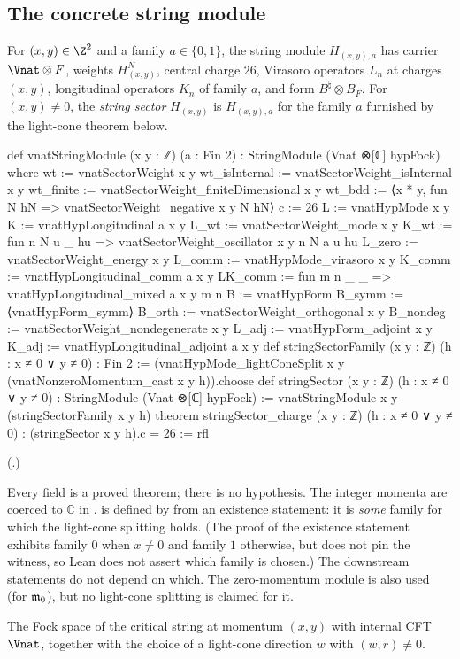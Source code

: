 \subsection{The concrete string module}

\begin{definition}\label{ch18:def:vnatstringmodule}
For $(x,y)\in\Z^2$ and a family $a\in\{0,1\}$, the string module $H_{(x,y),a}$ has carrier
$\Vnat\otimes F$, weights $H^N_{(x,y)}$, central charge $26$, Virasoro operators $L_n$ at charges $(x,y)$, longitudinal
operators $K_n$ of family $a$, and form $B^\natural\otimes B_F$.  For $(x,y)\neq0$, the \emph{string sector}
$H_{(x,y)}$ is $H_{(x,y),a}$ for the family $a$ furnished by the light-cone theorem below.
\end{definition}
\begin{leancode}
def vnatStringModule (x y : ℤ) (a : Fin 2) : StringModule (Vnat ⊗[ℂ] hypFock) where
  wt := vnatSectorWeight x y
  wt_isInternal := vnatSectorWeight_isInternal x y
  wt_finite := vnatSectorWeight_finiteDimensional x y
  wt_bdd := ⟨x * y, fun N hN => vnatSectorWeight_negative x y N hN⟩
  c := 26
  L := vnatHypMode x y
  K := vnatHypLongitudinal a x y
  L_wt := vnatSectorWeight_mode x y
  K_wt := fun n N u _ hu => vnatSectorWeight_oscillator x y n N a u hu
  L_zero := vnatSectorWeight_energy x y
  L_comm := vnatHypMode_virasoro x y
  K_comm := vnatHypLongitudinal_comm a x y
  LK_comm := fun m n _ _ => vnatHypLongitudinal_mixed a x y m n
  B := vnatHypForm
  B_symm := ⟨vnatHypForm_symm⟩
  B_orth := vnatSectorWeight_orthogonal x y
  B_nondeg := vnatSectorWeight_nondegenerate x y
  L_adj := vnatHypForm_adjoint x y
  K_adj := vnatHypLongitudinal_adjoint a x y
def stringSectorFamily (x y : ℤ) (h : x ≠ 0 ∨ y ≠ 0) : Fin 2 :=
  (vnatHypMode_lightConeSplit x y (vnatNonzeroMomentum_cast x y h)).choose
def stringSector (x y : ℤ) (h : x ≠ 0 ∨ y ≠ 0) :
    StringModule (Vnat ⊗[ℂ] hypFock) := vnatStringModule x y (stringSectorFamily x y h)
theorem stringSector_charge (x y : ℤ) (h : x ≠ 0 ∨ y ≠ 0) :
    (stringSector x y h).c = 26 := rfl
\end{leancode}
(.)
\begin{dictionary}
Every field is a proved theorem; there is no hypothesis.  The integer momenta are coerced to $\mathbb C$
in .   is defined by  from an existence
statement: it is \emph{some} family for which the light-cone splitting holds.  (The proof of the existence statement
exhibits family $0$ when $x\neq0$ and family $1$ otherwise, but  does not pin the witness, so Lean does not
assert which family is chosen.)  The downstream statements do not depend on which.  The zero-momentum
module  is also used (for $\mathfrak{m}_0$), but no light-cone splitting is claimed for it.
\end{dictionary}
\begin{physics}
The Fock space of the critical string at momentum $(x,y)$ with internal CFT $\Vnat$, together with the
choice of a light-cone direction $w$ with $(w,r)\neq0$.
\end{physics}

